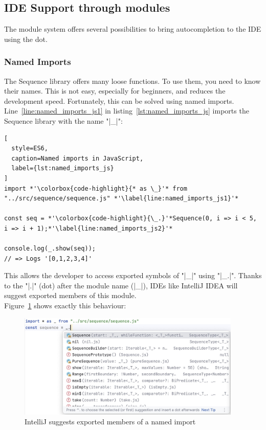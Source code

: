 \subsection{IDE Support through modules} %
\label{sub:IDE support through modules}
The module system offers several possibilities to bring autocompletion to
the IDE using the dot.
\subsubsection{Named Imports} %
\label{subsub:Named Imports}
The Sequence library offers many loose functions. To use them, you need to know
their names. This is not easy, especially for beginners, and reduces the
development speed. Fortunately, this can be solved using named imports.
Line~\ref{line:named_imports_js1} in listing~\ref{lst:named_imports_js} imports
the Sequence library with the name "|_|":

\begin{lstlisting}[
  style=ES6,
  caption=Named imports in JavaScript,
  label={lst:named_imports_js}
]
import *'\colorbox{code-highlight}{* as \_}'* from "../src/sequence/sequence.js" *'\label{line:named_imports_js1}'*

const seq = *'\colorbox{code-highlight}{\_.}'*Sequence(0, i => i < 5, i => i + 1);*'\label{line:named_imports_js2}'*

console.log(_.show(seq));
// => Logs '[0,1,2,3,4]'
\end{lstlisting}
This allows the developer to access exported symbols of "|_|" using "|_.|".
Thanks to the "|.|" (dot) after the module name (|_|), IDEs like IntelliJ IDEA
will suggest exported members of this module.\\
Figure~\ref{fig:the_power_of_the_dot_idea_sugg} shows exactly this behaviour:

\begin{figure}[H]
  \begin{center}
    \includegraphics[width=0.95\textwidth]{mainmatter/pictures/the-power-of-the-dot-intellj.jpg}
  \end{center}
  \caption{IntelliJ suggests exported members of a named import}
  \label{fig:the_power_of_the_dot_idea_sugg}
\end{figure}

